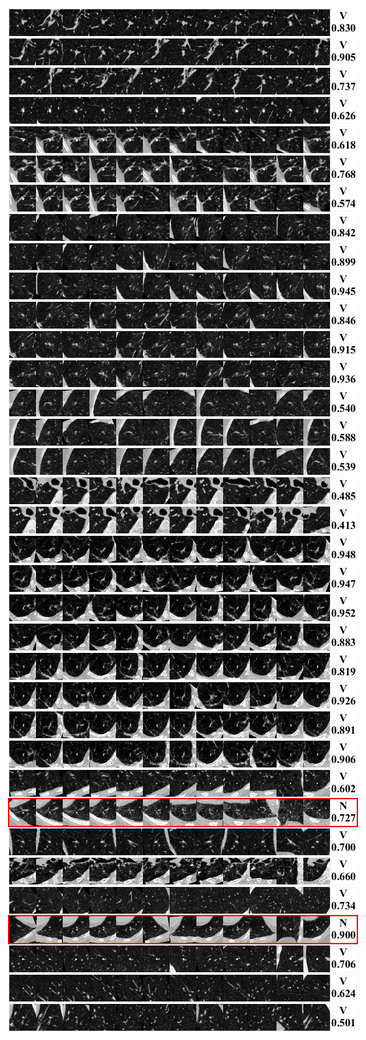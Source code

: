 \documentclass[onecolumn]{IEEEtran}
\begin{document}
\begin{figure}[H]
{\includegraphics[width=0.45\columnwidth]{./images/elcap-nodules-vessel1}
}
\end{figure}
\newpage
\end{document}
